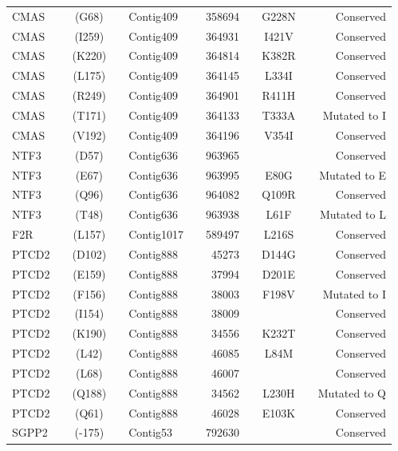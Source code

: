 \begin{center}
\begin{longtable}{lccclcrcccr}
CMAS     & & (G68)   & & Contig409  & & 358694   & & G228N   & & Conserved      \\
CMAS     & & (I259)  & & Contig409  & & 364931   & & I421V   & & Conserved      \\
CMAS     & & (K220)  & & Contig409  & & 364814   & & K382R   & & Conserved      \\
CMAS     & & (L175)  & & Contig409  & & 364145   & & L334I   & & Conserved      \\
CMAS     & & (R249)  & & Contig409  & & 364901   & & R411H   & & Conserved      \\
CMAS     & & (T171)  & & Contig409  & & 364133   & & T333A   & & Mutated to I   \\
CMAS     & & (V192)  & & Contig409  & & 364196   & & V354I   & & Conserved      \\
NTF3     & & (D57)   & & Contig636  & & 963965   & &         & & Conserved      \\
NTF3     & & (E67)   & & Contig636  & & 963995   & & E80G    & & Mutated to E   \\
NTF3     & & (Q96)   & & Contig636  & & 964082   & & Q109R   & & Conserved      \\
NTF3     & & (T48)   & & Contig636  & & 963938   & & L61F    & & Mutated to L   \\
F2R      & & (L157)  & & Contig1017 & & 589497   & & L216S   & & Conserved      \\
PTCD2    & & (D102)  & & Contig888  & & 45273    & & D144G   & & Conserved      \\
PTCD2    & & (E159)  & & Contig888  & & 37994    & & D201E   & & Conserved      \\
PTCD2    & & (F156)  & & Contig888  & & 38003    & & F198V   & & Mutated to I   \\
PTCD2    & & (I154)  & & Contig888  & & 38009    & &         & & Conserved      \\
PTCD2    & & (K190)  & & Contig888  & & 34556    & & K232T   & & Conserved      \\
PTCD2    & & (L42)   & & Contig888  & & 46085    & & L84M    & & Conserved      \\
PTCD2    & & (L68)   & & Contig888  & & 46007    & &         & & Conserved      \\
PTCD2    & & (Q188)  & & Contig888  & & 34562    & & L230H   & & Mutated to Q   \\
PTCD2    & & (Q61)   & & Contig888  & & 46028    & & E103K   & & Conserved      \\
SGPP2    & & (-175)  & & Contig53   & & 792630   & &         & & Conserved      \\

\end{longtable}
\end{center}
